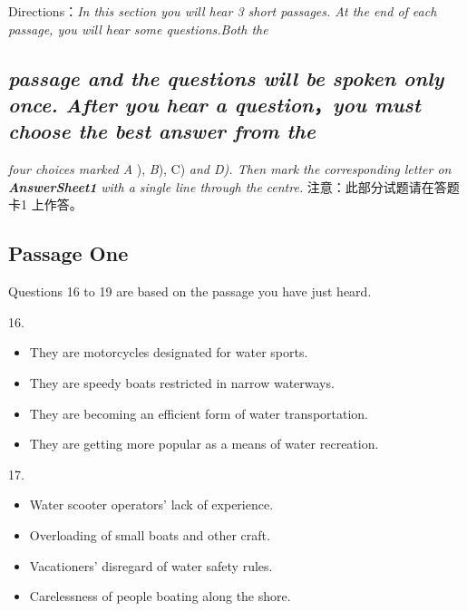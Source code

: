\documentclass[UTF8,11pt]{ctexart}
\begin{document}
Directions：\textit{In this section you will hear 3 short passages. At the end of each passage, you will hear some questions.Both the}


\subsection*{\textit{passage and the questions will be spoken only once. After you hear a question}，\textit{you must choose the best answer from the}}


\textit{four choices marked A} ),\textit{ B}), C)\textit{ and D). Then mark the corresponding letter on} \textbf{\textit{AnswerSheet1}} \textit{with a single line through the} \textit{centre.} 注意：此部分试题请在答题卡1 上作答。


\subsection*{Passage One}


Questions 16 to 19 are based on the passage you have just heard.


16.


\begin{itemize}[leftmargin=2em,itemsep=.2em,topsep=.4em]\item[A.] They are motorcycles designated for water sports.
\end{itemize}

\begin{itemize}[leftmargin=2em,itemsep=.2em,topsep=.4em]\item[B.] They are speedy boats restricted in narrow waterways.
\item[C.] They are becoming an efficient form of water transportation.
\item[D.] They are getting more popular as a means of water recreation.
\end{itemize}

17.


\begin{itemize}[leftmargin=2em,itemsep=.2em,topsep=.4em]\item[A.] Water scooter operators’ lack of experience.
\item[C.] Overloading of small boats and other craft.
\end{itemize}

\begin{itemize}[leftmargin=2em,itemsep=.2em,topsep=.4em]\item[B.] Vacationers’ disregard of water safety rules.
\item[D.] Carelessness of people boating along the shore.
\end{itemize}
\end{document}
